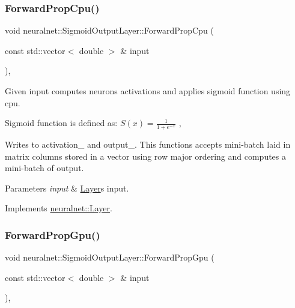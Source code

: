 \subsubsection{\texorpdfstring{Forward\+Prop\+Cpu()}{ForwardPropCpu()}}
{\footnotesize\ttfamily void neuralnet\+::\+Sigmoid\+Output\+Layer\+::\+Forward\+Prop\+Cpu (\begin{DoxyParamCaption}\item[{const std\+::vector$<$ double $>$ \&}]{input }\end{DoxyParamCaption})\hspace{0.3cm}{\ttfamily [protected]}, {\ttfamily [virtual]}}



Given input computes neurons\textquotesingle{} activations and applies sigmoid function using cpu. 

Sigmoid function is defined as\+: $S(x) = \frac{1}{{1 + e^{-x}}}$ ,

Writes to activation\+\_\+ and output\+\_\+. This functions accepts mini-\/batch laid in matrix columns stored in a vector using row major ordering and computes a mini-\/batch of output.


\begin{DoxyParams}{Parameters}
{\em input} & \hyperlink{classneuralnet_1_1Layer}{Layer}\textquotesingle{}s input. \\
\hline
\end{DoxyParams}


Implements \hyperlink{classneuralnet_1_1Layer_a3aa08517de6a73640cd0e511c134b231}{neuralnet\+::\+Layer}.

\mbox{\label{classneuralnet_1_1SigmoidOutputLayer_aaaa8a49435e351e688699a3d27db5c9a}} 
\subsubsection{\texorpdfstring{Forward\+Prop\+Gpu()}{ForwardPropGpu()}}
{\footnotesize\ttfamily void neuralnet\+::\+Sigmoid\+Output\+Layer\+::\+Forward\+Prop\+Gpu (\begin{DoxyParamCaption}\item[{const std\+::vector$<$ double $>$ \&}]{input }\end{DoxyParamCaption})\hspace{0.3cm}{\ttfamily [protected]}, {\ttfamily [virtual]}}



